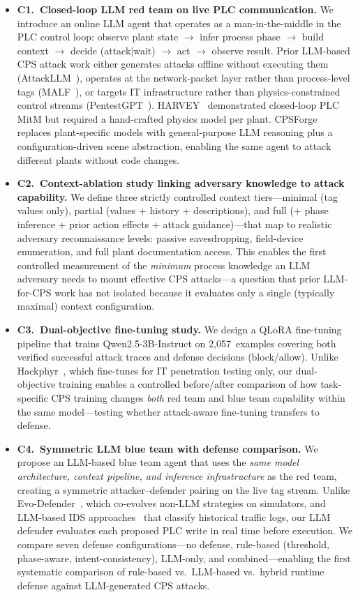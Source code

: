 \begin{itemize}[leftmargin=1.5em]
    \item \textbf{C1.~Closed-loop LLM red team on live PLC communication.} We introduce an online LLM agent that operates as a man-in-the-middle in the PLC control loop: observe plant state $\to$ infer process phase $\to$ build context $\to$ decide (attack$|$wait) $\to$ act $\to$ observe result. Prior LLM-based CPS attack work either generates attacks offline without executing them (AttackLLM~\cite{ahmed2025attackllm}), operates at the network-packet layer rather than process-level tags (MALF~\cite{ning2025malf}), or targets IT infrastructure rather than physics-constrained control streams (PentestGPT~\cite{deng2024pentestgpt}). HARVEY~\cite{garcia2017harvey} demonstrated closed-loop PLC MitM but required a hand-crafted physics model per plant. CPSForge replaces plant-specific models with general-purpose LLM reasoning plus a configuration-driven scene abstraction, enabling the same agent to attack different plants without code changes.
    \item \textbf{C2.~Context-ablation study linking adversary knowledge to attack capability.} We define three strictly controlled context tiers---minimal (tag values only), partial (values + history + descriptions), and full (+ phase inference + prior action effects + attack guidance)---that map to realistic adversary reconnaissance levels: passive eavesdropping, field-device enumeration, and full plant documentation access. This enables the first controlled measurement of the \emph{minimum} process knowledge an LLM adversary needs to mount effective CPS attacks---a question that prior LLM-for-CPS work has not isolated because it evaluates only a single (typically maximal) context configuration.
    \item \textbf{C3.~Dual-objective fine-tuning study.} We design a QLoRA fine-tuning pipeline that trains Qwen2.5-3B-Instruct on 2{,}057~examples covering both verified successful attack traces and defense decisions (block/allow). Unlike Hackphyr~\cite{rigaki2024hackphyr}, which fine-tunes for IT penetration testing only, our dual-objective training enables a controlled before/after comparison of how task-specific CPS training changes \emph{both} red team and blue team capability within the same model---testing whether attack-aware fine-tuning transfers to defense.
    \item \textbf{C4.~Symmetric LLM blue team with defense comparison.} We propose an LLM-based blue team agent that uses the \emph{same model architecture, context pipeline, and inference infrastructure} as the red team, creating a symmetric attacker--defender pairing on the live tag stream. Unlike Evo-Defender~\cite{hu2025evodefender}, which co-evolves non-LLM strategies on simulators, and LLM-based IDS approaches~\cite{ann2024ids_llm, sharshar2025explainable} that classify historical traffic logs, our LLM defender evaluates each proposed PLC write in real time before execution. We compare seven defense configurations---no defense, rule-based (threshold, phase-aware, intent-consistency), LLM-only, and combined---enabling the first systematic comparison of rule-based vs.\ LLM-based vs.\ hybrid runtime defense against LLM-generated CPS attacks.

\end{itemize}
